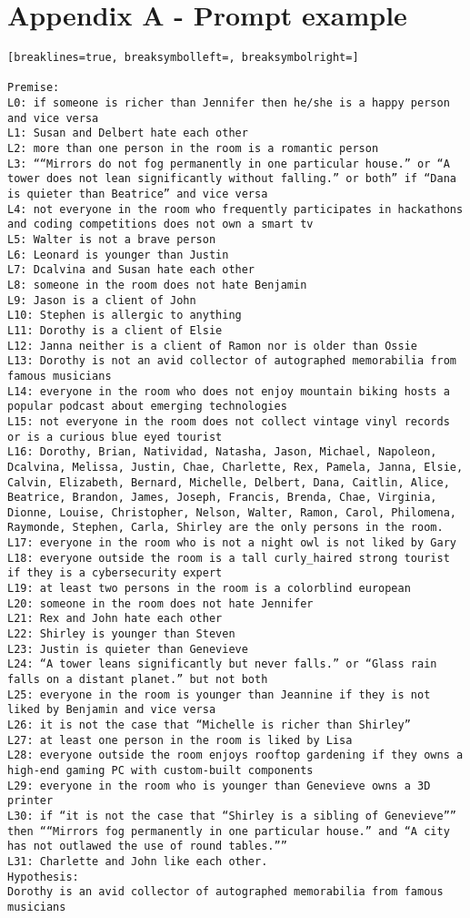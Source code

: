 \documentclass[11pt]{article}
\begin{document}
\fi 



\onecolumn %
\appendix
\renewcommand\thesection{\Alph{section}} %
\section{Appendix A - Prompt example\label{appendixA}}
\begin{Verbatim}[breaklines=true, breaksymbolleft=, breaksymbolright=]

Premise:
L0: if someone is richer than Jennifer then he/she is a happy person and vice versa
L1: Susan and Delbert hate each other
L2: more than one person in the room is a romantic person
L3: ““Mirrors do not fog permanently in one particular house.” or “A tower does not lean significantly without falling.” or both” if “Dana is quieter than Beatrice” and vice versa
L4: not everyone in the room who frequently participates in hackathons and coding competitions does not own a smart tv
L5: Walter is not a brave person
L6: Leonard is younger than Justin
L7: Dcalvina and Susan hate each other
L8: someone in the room does not hate Benjamin
L9: Jason is a client of John
L10: Stephen is allergic to anything
L11: Dorothy is a client of Elsie
L12: Janna neither is a client of Ramon nor is older than Ossie
L13: Dorothy is not an avid collector of autographed memorabilia from famous musicians
L14: everyone in the room who does not enjoy mountain biking hosts a popular podcast about emerging technologies
L15: not everyone in the room does not collect vintage vinyl records or is a curious blue eyed tourist
L16: Dorothy, Brian, Natividad, Natasha, Jason, Michael, Napoleon, Dcalvina, Melissa, Justin, Chae, Charlette, Rex, Pamela, Janna, Elsie, Calvin, Elizabeth, Bernard, Michelle, Delbert, Dana, Caitlin, Alice, Beatrice, Brandon, James, Joseph, Francis, Brenda, Chae, Virginia, Dionne, Louise, Christopher, Nelson, Walter, Ramon, Carol, Philomena, Raymonde, Stephen, Carla, Shirley are the only persons in the room.
L17: everyone in the room who is not a night owl is not liked by Gary
L18: everyone outside the room is a tall curly_haired strong tourist if they is a cybersecurity expert
L19: at least two persons in the room is a colorblind european
L20: someone in the room does not hate Jennifer
L21: Rex and John hate each other
L22: Shirley is younger than Steven
L23: Justin is quieter than Genevieve
L24: “A tower leans significantly but never falls.” or “Glass rain falls on a distant planet.” but not both
L25: everyone in the room is younger than Jeannine if they is not liked by Benjamin and vice versa
L26: it is not the case that “Michelle is richer than Shirley”
L27: at least one person in the room is liked by Lisa
L28: everyone outside the room enjoys rooftop gardening if they owns a high-end gaming PC with custom-built components
L29: everyone in the room who is younger than Genevieve owns a 3D printer
L30: if “it is not the case that “Shirley is a sibling of Genevieve”” then ““Mirrors fog permanently in one particular house.” and “A city has not outlawed the use of round tables.””
L31: Charlette and John like each other.
Hypothesis:
Dorothy is an avid collector of autographed memorabilia from famous musicians


\end{Verbatim}
\end{document}
